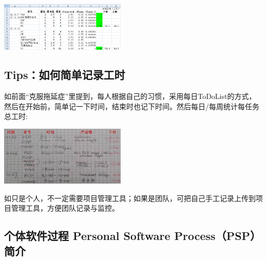 
\includegraphics[width=6cm]{PSPcalculate3wks95rangeScreenshot_2022-11-26_105325.png}

\hypertarget{tipsux5982ux4f55ux7b80ux5355ux8bb0ux5f55ux5de5ux65f6}{%
\subsection{Tips：如何简单记录工时}\label{tipsux5982ux4f55ux7b80ux5355ux8bb0ux5f55ux5de5ux65f6}}

如前面``克服拖延症''里提到，每人根据自己的习惯，采用每日ToDoList的方式，然后在开始前，简单记一下时间，结束时也记下时间。然后每日/每周统计每任务总工时:


\includegraphics[width=6cm]{Psp手工时间表12.jpg}

如只是个人，不一定需要项目管理工具；如果是团队，可把自己手工记录上传到项目管理工具，方便团队记录与监控。

\hypertarget{ux4e2aux4f53ux8f6fux4ef6ux8fc7ux7a0b-personal-software-processpsp-ux7b80ux4ecb}{%
\subsection{个体软件过程 Personal Software Process（PSP）
简介}\label{ux4e2aux4f53ux8f6fux4ef6ux8fc7ux7a0b-personal-software-processpsp-ux7b80ux4ecb}}


